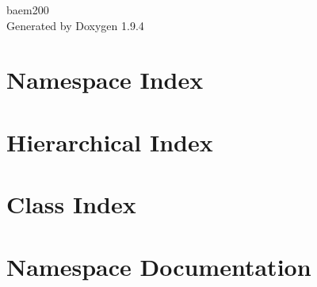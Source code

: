 \documentclass[twoside]{book}
\newcommand{\+}{\discretionary{\mbox{\scriptsize$\hookleftarrow$}}{}{}}
\newcommand{\clearemptydoublepage}{%
    \newpage{\pagestyle{empty}\cleardoublepage}%
  }
\begin{document}
  \raggedbottom
    \hypersetup{pageanchor=false,
                bookmarksnumbered=true,
                pdfencoding=unicode
               }
  \begin{titlepage}
  \vspace*{7cm}
  \begin{center}%
  {\Large baem200}\\
  \vspace*{1cm}
  {\large Generated by Doxygen 1.9.4}\\
  \end{center}
  \end{titlepage}
  \clearemptydoublepage
  \tableofcontents
  \clearemptydoublepage
  \hypersetup{pageanchor=true}
\chapter{Namespace Index}

\chapter{Hierarchical Index}

\chapter{Class Index}

\chapter{Namespace Documentation}

\end{document}
